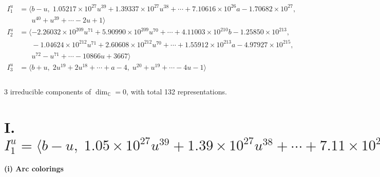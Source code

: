\documentclass[1p]{elsarticle_modified}
\theoremstyle{definition}
\begin{document}
\begin{align*}
I^u_{1}&=\langle 
b- u,\;1.05217\times10^{27} u^{39}+1.39337\times10^{27} u^{38}+\cdots+7.10616\times10^{26} a-1.70682\times10^{27},\\
\phantom{I^u_{1}}&\phantom{= \langle  }u^{40}+u^{39}+\cdots-2 u+1\rangle \\
I^u_{2}&=\langle 
-2.26032\times10^{209} u^{71}+5.90990\times10^{209} u^{70}+\cdots+4.11003\times10^{210} b-1.25850\times10^{213},\\
\phantom{I^u_{2}}&\phantom{= \langle  }-1.04624\times10^{212} u^{71}+2.60608\times10^{212} u^{70}+\cdots+1.55912\times10^{213} a-4.97927\times10^{215},\\
\phantom{I^u_{2}}&\phantom{= \langle  }u^{72}- u^{71}+\cdots-10866 u+3667\rangle \\
I^u_{3}&=\langle 
b+u,\;2 u^{19}+2 u^{18}+\cdots+a-4,\;u^{20}+u^{19}+\cdots-4 u-1\rangle \\
\\
\end{align*}
\raggedright * 3 irreducible components of $\dim_{\mathbb{C}}=0$, with total 132 representations.\\
\newpage
\renewcommand{\arraystretch}{1}
\centering \section*{I. $I^u_{1}= \langle b- u,\;1.05\times10^{27} u^{39}+1.39\times10^{27} u^{38}+\cdots+7.11\times10^{26} a-1.71\times10^{27},\;u^{40}+u^{39}+\cdots-2 u+1 \rangle$}
\flushleft \textbf{(i) Arc colorings}\\
\end{document}
